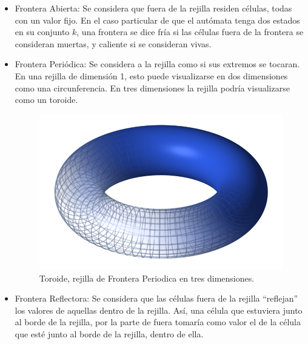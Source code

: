\begin{itemize}
\item Frontera Abierta: Se considera que fuera de la rejilla residen células, todas con un valor fijo. En el caso particular de que el autómata tenga dos estados en su conjunto $k$, una frontera se dice fría si las células fuera de la frontera se consideran muertas, y caliente si se consideran vivas.
\item Frontera Periódica: Se considera a la rejilla como si sus extremos se tocaran. En una rejilla de dimensión 1, esto puede visualizarse en dos dimensiones como una circunferencia. En tres dimensiones la rejilla podría visualizarse como un toroide.

\begin{figure}[H]
\centering
\includegraphics[scale=0.25]{imagenes/Torus.png}
\caption{Toroide, rejilla de Frontera Periodica en tres dimensiones.}
\label{fig:torus}

\end{figure}

\item Frontera Reflectora:  Se considera que las células fuera de la rejilla ``reflejan'' los valores de aquellas dentro de la rejilla. Así, una célula que estuviera junto al borde de la rejilla, por la parte de fuera tomaría como valor el de la célula que esté junto al borde de la rejilla, dentro de ella. 


\end{itemize}
